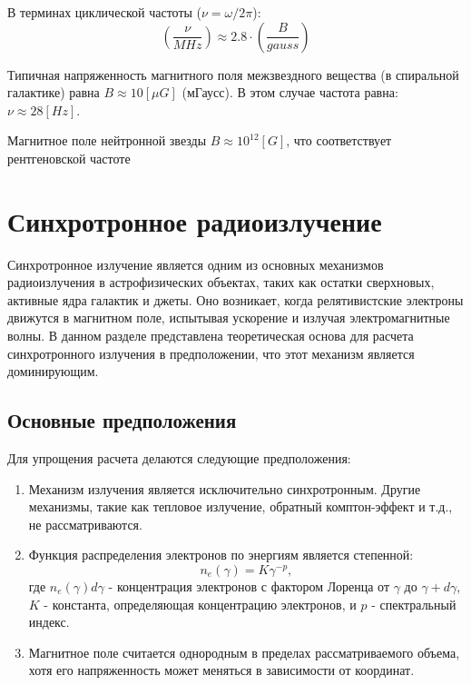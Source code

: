 \documentclass[a4paper,12pt]{extarticle}
\begin{document}
    В терминах циклической частоты ($\nu = \omega/2\pi$):
    \[
        \left(\frac{\nu}{MHz}\right) \approx 2.8 \cdot \left(\frac{B}{gauss}\right)
    \]
 
    Типичная напряженность магнитного поля межзвездного вещества (в спиральной галактике) равна $B \approx 10 [\mu G]$ (мГаусс).
    В этом случае частота равна: $\nu \approx 28 [Hz]$. 

    Магнитное поле нейтронной звезды
    $B \approx 10^{12} [G]$, что соответствует рентгеновской частоте

\section{Синхротронное радиоизлучение}

Синхротронное излучение является одним из основных механизмов радиоизлучения в астрофизических объектах, таких как остатки сверхновых, активные ядра галактик и джеты. Оно возникает, когда релятивистские электроны движутся в магнитном поле, испытывая ускорение и излучая электромагнитные волны. В данном разделе представлена теоретическая основа для расчета синхротронного излучения в предположении, что этот механизм является доминирующим.

\subsection{Основные предположения}

Для упрощения расчета делаются следующие предположения:

\begin{enumerate}
    \item Механизм излучения является исключительно синхротронным. Другие механизмы, такие как тепловое излучение, обратный комптон-эффект и т.д., не рассматриваются.
    \item Функция распределения электронов по энергиям является степенной:
    \begin{equation}
        n_e(\gamma) = K \gamma^{-p},
    \end{equation}
    где $n_e(\gamma) d\gamma$ - концентрация электронов с фактором Лоренца от $\gamma$ до $\gamma + d\gamma$, $K$ - константа, определяющая концентрацию электронов, и $p$ - спектральный индекс.
    \item Магнитное поле считается однородным в пределах рассматриваемого объема, хотя его напряженность может меняться в зависимости от координат.
\end{enumerate}
\end{document}
